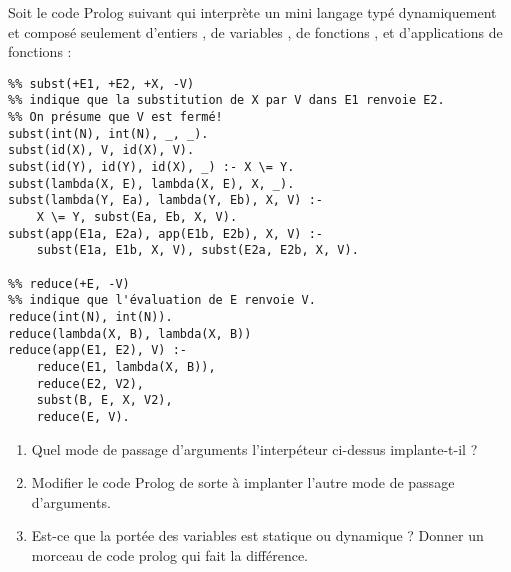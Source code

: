 \begin{Exercise}
  \label{ex:prolog_evaluation}
Soit le code Prolog suivant qui interprète un mini langage typé
dynamiquement et composé seulement d'entiers , de
variables , de fonctions ,
et d'applications de fonctions :

\begin{verbatim}
%% subst(+E1, +E2, +X, -V)
%% indique que la substitution de X par V dans E1 renvoie E2.
%% On présume que V est fermé!
subst(int(N), int(N), _, _).
subst(id(X), V, id(X), V).
subst(id(Y), id(Y), id(X), _) :- X \= Y.
subst(lambda(X, E), lambda(X, E), X, _).
subst(lambda(Y, Ea), lambda(Y, Eb), X, V) :-
    X \= Y, subst(Ea, Eb, X, V).
subst(app(E1a, E2a), app(E1b, E2b), X, V) :-
    subst(E1a, E1b, X, V), subst(E2a, E2b, X, V).

%% reduce(+E, -V)
%% indique que l'évaluation de E renvoie V.
reduce(int(N), int(N)).
reduce(lambda(X, B), lambda(X, B))
reduce(app(E1, E2), V) :-
    reduce(E1, lambda(X, B)),
    reduce(E2, V2),
    subst(B, E, X, V2),
    reduce(E, V).
\end{verbatim}

\begin{enumerate}

\item Quel mode de passage d'arguments l'interpéteur ci-dessus implante-t-il ?
\item Modifier le code Prolog de sorte à implanter l'autre mode de
  passage d'arguments.
\item Est-ce que la portée des variables est statique ou dynamique ?
  Donner un morceau de code prolog qui fait la différence.

\end{enumerate}
\end{Exercise}

\begin{Answer}[ref={ex:prolog_evaluation}]
\end{Answer}